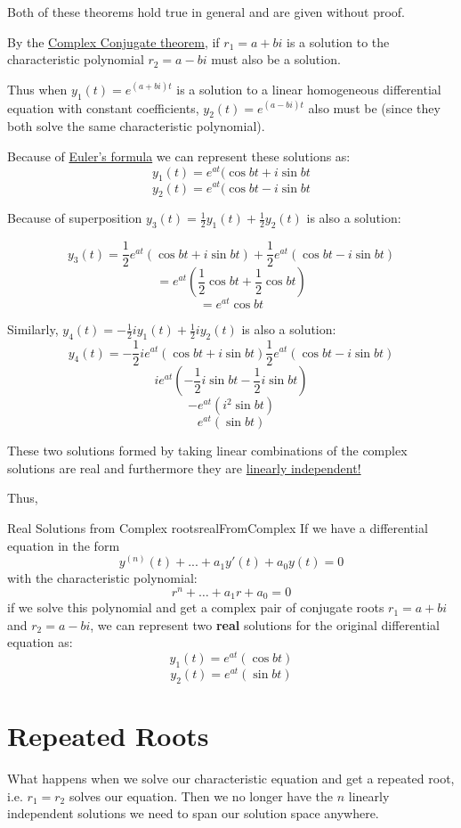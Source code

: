 \documentclass{report}
\begin{document}
Both of these theorems hold true in general and are given without proof.

By the \hyperref[th:comConjRoot]{Complex Conjugate theorem}, if $r_1=a+bi$ is a solution to the characteristic polynomial $r_2 = a-bi$ must also be a solution.

Thus when $y_1(t) = e^{(a+bi)t}$ is a solution to a linear homogeneous differential equation with constant coefficients, $y_2(t) = e^{(a-bi)t}$ also must be (since they both solve the same characteristic polynomial).

Because of \hyperref[th:euler]{Euler's formula} we can represent these solutions as:
$$y_1(t) = e^{at}(\cos{bt}+i\sin{bt}$$
$$y_2(t) = e^{at}(\cos{bt}-i\sin{bt}$$

Because of superposition $y_3(t) =\frac{1}{2}y_1(t)+\frac{1}{2}y_2(t)$ is also a solution:

$$y_3(t) = \frac{1}{2}e^{at}(\cos{bt}+i\sin{bt})+ \frac{1}{2}e^{at}(\cos{bt}-i\sin{bt})$$
$$=e^{at}(\frac{1}{2}\cos{bt} + \frac{1}{2}\cos{bt})$$
$$=e^{at}\cos{bt}$$

Similarly, $y_4(t)=-\frac{1}{2}iy_1(t) + \frac{1}{2}iy_2(t)$ is also a solution:
$$y_4(t) = -\frac{1}{2}ie^{at}(\cos{bt}+i\sin{bt})  \frac{1}{2}e^{at}(\cos{bt}-i\sin{bt})$$
$$ie^{at}(-\frac{1}{2}i\sin{bt} - \frac{1}{2}i\sin{bt})$$
$$-e^{at}(i^2\sin{bt})$$
$$e^{at}(\sin{bt})$$


\label{sinLin}
These two solutions formed by taking linear combinations of the complex solutions are real and furthermore they are \hyperref[sec:prSinLin]{linearly independent!}

Thus,

\begin{mytheo}{Real Solutions from Complex roots}{realFromComplex}
    If we have a differential equation in the form 
    $$y^{(n)}(t) + ... + a_1y'(t) + a_0y(t) = 0$$
    with the characteristic polynomial:
    $$r^n+\dots+a_1r+a_0=0$$
    if we solve this polynomial and get a complex pair of conjugate roots $r_1 = a+bi$ and $r_2 = a-bi$, we can represent two \textbf{real} solutions for the original differential equation as:
    $$y_1(t) = e^{at}(\cos{bt})$$
    $$y_2(t) = e^{at}(\sin{bt})$$
\end{mytheo}

\section{Repeated Roots}
What happens when we solve our characteristic equation and get a repeated root, i.e. $r_1=r_2$ solves our equation. Then we no longer have the $n$ linearly independent solutions we need to span our solution space anywhere.
\end{document}
